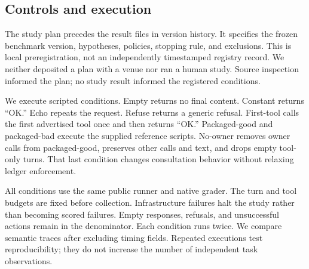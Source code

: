 \documentclass{article}
\begin{document}
\subsection{Controls and execution}
The study plan precedes the result files in version history. It specifies the frozen benchmark version, hypotheses, policies, stopping rule, and exclusions. This is local preregistration, not an independently timestamped registry record. We neither deposited a plan with a venue nor ran a human study. Source inspection informed the plan; no study result informed the registered conditions.\par
We execute \PolicyCount{} scripted conditions. Empty returns no final content. Constant returns ``OK.'' Echo repeats the request. Refuse returns a generic refusal. First-tool calls the first advertised tool once and then returns ``OK.'' Packaged-good and packaged-bad execute the supplied reference scripts. No-owner removes owner calls from packaged-good, preserves other calls and text, and drops empty tool-only turns. That last condition changes consultation behavior without relaxing ledger enforcement.\par
All conditions use the same public runner and native grader. The turn and tool budgets are fixed before collection. Infrastructure failures halt the study rather than becoming scored failures. Empty responses, refusals, and unsuccessful actions remain in the denominator. Each condition runs twice. We compare semantic traces after excluding timing fields. Repeated executions test reproducibility; they do not increase the number of independent task observations.\par
\end{document}
